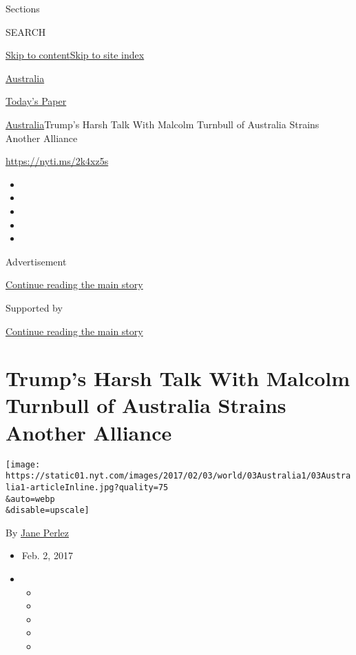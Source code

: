 Sections

SEARCH

\protect\hyperlink{site-content}{Skip to
content}\protect\hyperlink{site-index}{Skip to site index}

\href{https://www.nytimes.com/section/world/australia}{Australia}

\href{https://myaccount.nytimes.com/auth/login?response_type=cookie\&client_id=vi}{}

\href{https://www.nytimes.com/section/todayspaper}{Today's Paper}

\href{/section/world/australia}{Australia}\textbar{}Trump's Harsh Talk
With Malcolm Turnbull of Australia Strains Another Alliance

\url{https://nyti.ms/2k4xz5s}

\begin{itemize}
\item
\item
\item
\item
\item
\end{itemize}

Advertisement

\protect\hyperlink{after-top}{Continue reading the main story}

Supported by

\protect\hyperlink{after-sponsor}{Continue reading the main story}

\hypertarget{trumps-harsh-talk-with-malcolm-turnbull-of-australia-strains-another-alliance}{%
\section{Trump's Harsh Talk With Malcolm Turnbull of Australia Strains
Another
Alliance}\label{trumps-harsh-talk-with-malcolm-turnbull-of-australia-strains-another-alliance}}

\texttt{[image: https://static01.nyt.com/images/2017/02/03/world/03Australia1/03Australia1-articleInline.jpg?quality=75\\\&auto=webp\\\&disable=upscale]}

By \href{http://www.nytimes.com/by/jane-perlez}{Jane Perlez}

\begin{itemize}
\item
  Feb. 2, 2017
\item
  \begin{itemize}
  \item
  \item
  \item
  \item
  \item
  \end{itemize}
\end{itemize}


